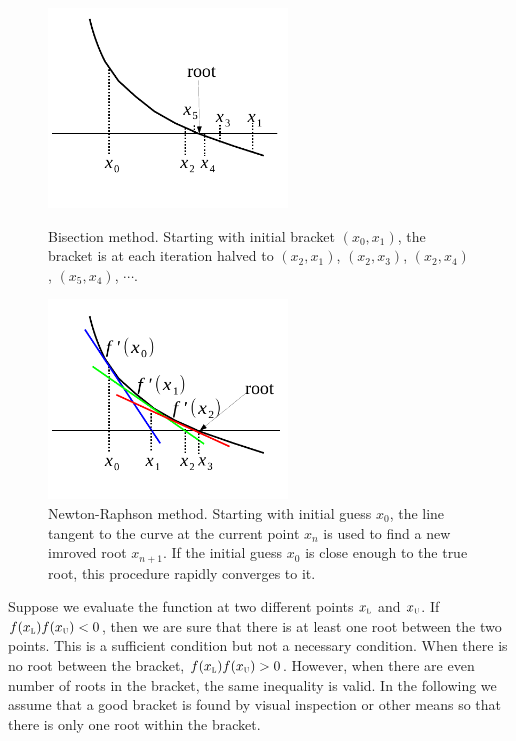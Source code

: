 \begin{figure}
\begin{minipage}{0.47\linewidth}
\centerline{\includegraphics[width=2.5in]{04.root-finding/bisection.pdf}}
\caption{Bisection method. Starting with initial bracket $(x_0, x_1)$, the bracket is at each iteration halved to $(x_2,x_1)$, $(x_2,x_3)$, $(x_2, x_4)$, $(x_5, x_4)$, $\cdots$.}\label{fig:bisection}
\end{minipage}
\hfill
\begin{minipage}{0.47\linewidth}
\centerline{\includegraphics[width=2.5in]{04.root-finding/newton-raphson.pdf}}
\caption{Newton-Raphson method. Starting with initial guess $x_0$, the line tangent to the curve at the current point $x_n$ is used to find a new imroved root $x_{n+1}$.  If the initial guess $x_0$ is close enough to the true root, this procedure rapidly converges to it.}\label{fig:newton-raphson}
\end{minipage}
\end{figure}

Suppose we evaluate the function at two different points $x_\textsc{l}$ and $x_\textsc{u}$.  If $f(x_\textsc{l}) f(x_\textsc{u}) < 0$, then we are sure that there is at least one root between the two points.  This is a sufficient condition but not a necessary condition.  When there is no root between the bracket, $f(x_\textsc{l}) f(x_\textsc{u}) >0$.  However, when there are even number of roots in the bracket, the same inequality is valid.  In the following we assume that a good bracket is found by visual inspection or other means so that there is only one root within the bracket. 

